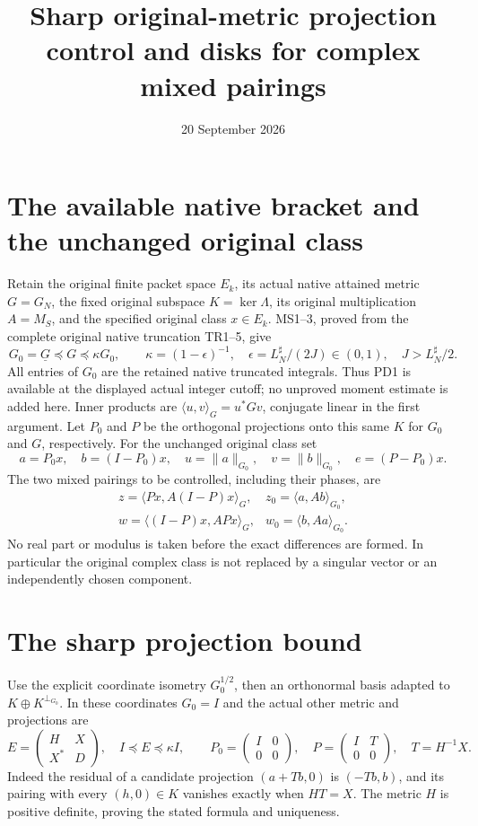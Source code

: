 \documentclass[11pt]{article}
\title{Sharp original-metric projection control and disks for complex mixed pairings}
\author{}
\date{20 September 2026}
\begin{document}
\maketitle

\section{The available native bracket and the unchanged original class}
Retain the original finite packet space $E_k$, its actual native attained
metric $G=G_N$, the fixed original subspace $K=\ker\Lambda$, its original
multiplication $A=M_S$, and the specified original class $x\in E_k$.
MS1--3, proved from the complete original native truncation TR1--5, give
\[
 G_0=\underline G\preceq G\preceq\kappa G_0,\qquad
 \kappa=(1-\epsilon)^{-1},\quad
 \epsilon=L_N^\sharp/(2J)\in(0,1),\quad J>L_N^\sharp/2.          \tag{PD1}
\]
All entries of $G_0$ are the retained native truncated integrals.
Thus PD1 is available at the displayed actual integer cutoff; no
unproved moment estimate is added here.  Inner products are
$\langle u,v\rangle_G=u^*Gv$, conjugate linear in the first argument.
Let $P_0$ and $P$ be the orthogonal projections onto this same $K$
for $G_0$ and $G$, respectively.  For the unchanged original class set
\[
 a=P_0x,\quad b=(I-P_0)x,\quad
 u=\|a\|_{G_0},\quad v=\|b\|_{G_0},\quad
 e=(P-P_0)x.
                                                                    \tag{PD2}
\]
The two mixed pairings to be controlled, including their phases, are
\[
 \begin{array}{ll}
 z=\langle Px,A(I-P)x\rangle_G,
   &z_0=\langle a,Ab\rangle_{G_0},\\
 w=\langle(I-P)x,APx\rangle_G,
   &w_0=\langle b,Aa\rangle_{G_0}.
 \end{array}                                                       \tag{PD3}
\]
No real part or modulus is taken before the exact differences are
formed.  In particular the original complex class is not replaced
by a singular vector or an independently chosen component.

\section{The sharp projection bound}
Use the explicit coordinate isometry $G_0^{1/2}$, then an orthonormal
basis adapted to $K\oplus K^{\perp_{G_0}}$.  In these coordinates
$G_0=I$ and the actual other metric and projections are
\[
 E=\begin{pmatrix}H&X\\X^*&D\end{pmatrix},\quad I\preceq E\preceq\kappa I,
 \qquad P_0=\begin{pmatrix}I&0\\0&0\end{pmatrix},\quad
 P=\begin{pmatrix}I&T\\0&0\end{pmatrix},\quad T=H^{-1}X.          \tag{PD4}
\]
Indeed the residual of a candidate projection $(a+Tb,0)$ is
$(-Tb,b)$, and its pairing with every $(h,0)\in K$ vanishes exactly
when $HT=X$.  The metric $H$ is positive definite, proving the
stated formula and uniqueness.
\end{document}
